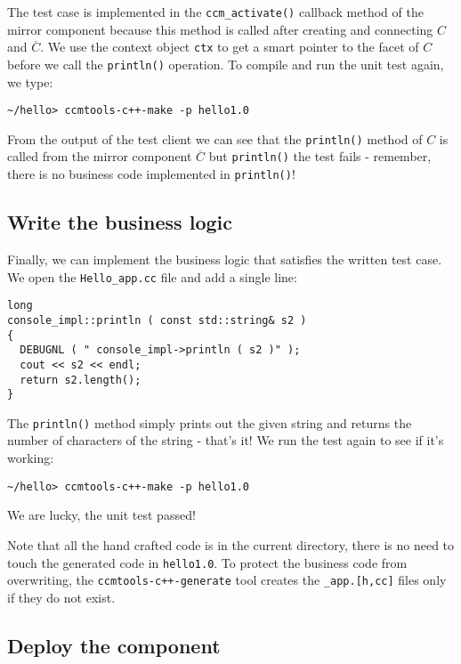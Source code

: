 \noindent
The test case is implemented in the {\tt ccm\_activate()} callback method of the mirror
component because this method is called after creating and connecting
$C$ and $\overline{C}$.  
We use the context object {\tt ctx} to get a smart pointer to the facet of $C$
before we call the {\tt println()} operation.
To compile and run the unit test again, we type:
\begin{verbatim}
~/hello> ccmtools-c++-make -p hello1.0
\end{verbatim}
From the output of the test client we can see that the {\tt println()} method
of $C$ is called from the mirror component $\overline{C}$ but {\tt println()}
the test fails - remember, there is no business code implemented in {\tt println()}!




\subsection{Write the business logic}

Finally, we can implement the business logic that satisfies the written test case.
We open the {\tt Hello\_app.cc} file and add a single line:
\begin{verbatim}
long
console_impl::println ( const std::string& s2 )
{
  DEBUGNL ( " console_impl->println ( s2 )" );
  cout << s2 << endl;
  return s2.length();
}
\end{verbatim}

\noindent
The {\tt println()} method simply prints out the given string and returns the number
of characters of the string - that's it!
We run the test again to see if it's working:
\begin{verbatim}
~/hello> ccmtools-c++-make -p hello1.0
\end{verbatim}

\noindent
We are lucky, the unit test passed!

\noindent
Note that all the hand crafted code is in the current directory, there is no
need to touch the generated code in {\tt hello1.0}.
To protect the business code from overwriting, the {\tt ccmtools-c++-generate} 
tool creates the {\tt *\_app.[h,cc]} files only if they do not exist. 


\subsection{Deploy the component}

